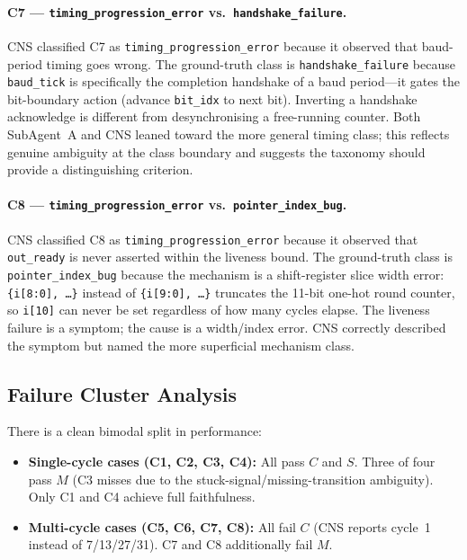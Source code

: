 \documentclass[11pt,a4paper]{article}
\begin{document}
\paragraph{C7 --- \texttt{timing\_progression\_error} vs.\ \texttt{handshake\_failure}.}
CNS classified C7 as \texttt{timing\_progression\_error} because it observed
that baud-period timing goes wrong. The ground-truth class is
\texttt{handshake\_failure} because \texttt{baud\_tick} is specifically the
completion handshake of a baud period---it gates the bit-boundary action
(advance \texttt{bit\_idx} to next bit). Inverting a handshake acknowledge is
different from desynchronising a free-running counter. Both SubAgent~A and CNS
leaned toward the more general timing class; this reflects genuine ambiguity at
the class boundary and suggests the taxonomy should provide a distinguishing
criterion.

\paragraph{C8 --- \texttt{timing\_progression\_error} vs.\ \texttt{pointer\_index\_bug}.}
CNS classified C8 as \texttt{timing\_progression\_error} because it observed
that \texttt{out\_ready} is never asserted within the liveness bound. The
ground-truth class is \texttt{pointer\_index\_bug} because the mechanism is a
shift-register slice width error: \texttt{\{i[8:0], \ldots\}} instead of
\texttt{\{i[9:0], \ldots\}} truncates the 11-bit one-hot round counter, so
\texttt{i[10]} can never be set regardless of how many cycles elapse. The
liveness failure is a symptom; the cause is a width/index error. CNS correctly
described the symptom but named the more superficial mechanism class.

\subsection{Failure Cluster Analysis}

There is a clean bimodal split in performance:

\begin{itemize}
  \item \textbf{Single-cycle cases (C1, C2, C3, C4):} All pass $C$ and $S$.
    Three of four pass $M$ (C3 misses due to the stuck-signal/missing-transition
    ambiguity). Only C1 and C4 achieve full faithfulness.
  \item \textbf{Multi-cycle cases (C5, C6, C7, C8):} All fail $C$ (CNS reports
    cycle~1 instead of 7/13/27/31). C7 and C8 additionally fail $M$.
\end{itemize}
\end{document}
